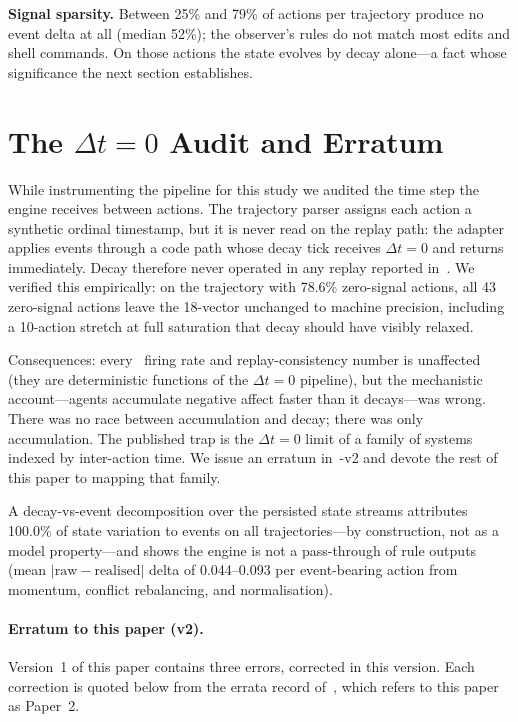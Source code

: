 \textbf{Signal sparsity.} Between 25\% and 79\% of actions per trajectory
produce no event delta at all (median 52\%); the observer's rules do not match
most edits and shell commands. On those actions the state evolves by decay
alone---a fact whose significance the next section establishes.

\section{The $\Delta t = 0$ Audit and Erratum}
\label{sec:audit}

While instrumenting the pipeline for this study we audited the time step the
engine receives between actions. The trajectory parser assigns each action a
synthetic ordinal timestamp, but it is never read on the replay path: the
adapter applies events through a code path whose decay tick receives
$\Delta t = 0$ and returns immediately. Decay therefore never operated in any
replay reported in~\cite{P1}. We verified this empirically: on the trajectory
with 78.6\% zero-signal actions, all 43 zero-signal actions leave the 18-vector
unchanged to machine precision, including a 10-action stretch at full saturation
that decay should have visibly relaxed.

Consequences: every~\cite{P1} firing rate and replay-consistency number is
unaffected (they are deterministic functions of the $\Delta t = 0$ pipeline),
but the mechanistic account---agents accumulate negative affect faster than it
decays---was wrong. There was no race between accumulation and decay; there was
only accumulation. The published trap is the $\Delta t = 0$ limit of a family of
systems indexed by inter-action time. We issue an erratum in~\cite{P1}-v2 and
devote the rest of this paper to mapping that family.

A decay-vs-event decomposition over the persisted state streams attributes
100.0\% of state variation to events on all trajectories---by construction, not
as a model property---and shows the engine is not a pass-through of rule outputs
(mean $|\text{raw} - \text{realised}|$ delta of 0.044--0.093 per event-bearing
action from momentum, conflict rebalancing, and normalisation).

\paragraph{Erratum to this paper (v2).} Version~1 of this paper contains three
errors, corrected in this version. Each correction is quoted below from the
errata record of~\cite{P3}, which refers to this paper as Paper~2.

